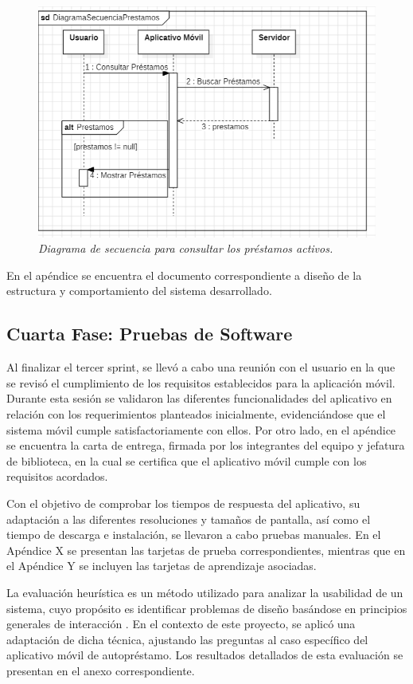 \documentclass[spanish]{ieee_upb}
\begin{document}
\begin{figure}[H] 
	\centering
	\includegraphics[width=0.6\linewidth]{img/secuenciaPrestamos.png}
	\vspace{-1mm}
	\caption[Diagrama de secuencia para consultar los préstamos activos.]{\textit{Diagrama de secuencia para consultar los préstamos activos.}}
	\label{fig:secuenciaPrestamos} 
\end{figure}
En el apéndice se encuentra el documento correspondiente a diseño de la estructura y comportamiento del sistema desarrollado.

\subsection{Cuarta Fase: Pruebas de Software}
Al finalizar el tercer sprint, se llevó a cabo una reunión con el usuario en la que se revisó el cumplimiento de los requisitos establecidos para la aplicación móvil. Durante esta sesión se validaron las diferentes funcionalidades del aplicativo en relación con los requerimientos planteados inicialmente, evidenciándose que el sistema móvil cumple satisfactoriamente con ellos. Por otro lado, en el apéndice se encuentra la carta de entrega, firmada por los integrantes del equipo y jefatura de biblioteca, en la cual se certifica que el aplicativo móvil cumple con los requisitos acordados.
\vspace{0.3 cm}

Con el objetivo de comprobar los tiempos de respuesta del aplicativo, su adaptación a las diferentes resoluciones y tamaños de pantalla, así como el tiempo de descarga e instalación, se llevaron a cabo pruebas manuales. En el Apéndice X se presentan las tarjetas de prueba correspondientes, mientras que en el Apéndice Y se incluyen las tarjetas de aprendizaje asociadas.
\vspace{0.3 cm}

La evaluación heurística es un método utilizado para analizar la usabilidad de un sistema, cuyo propósito es identificar problemas de diseño basándose en principios generales de interacción \cite{nielsen1990heuristic}. En el contexto de este proyecto, se aplicó una adaptación de dicha técnica, ajustando las preguntas al caso específico del aplicativo móvil de autopréstamo. Los resultados detallados de esta evaluación se presentan en el anexo correspondiente.
\vspace{0.3 cm}
\end{document}
